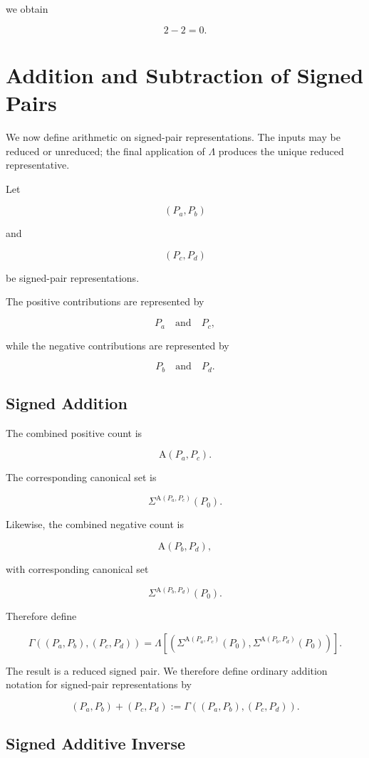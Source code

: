 \documentclass[12pt]{article}
\newcommand{\Alpha}{\mathrm{A}}
\begin{document}
we obtain

\[
\boxed{
2-2=0.
}
\]

\section*{Addition and Subtraction of Signed Pairs}

We now define arithmetic on signed-pair representations. The inputs may be reduced or unreduced; the final application of \(\Lambda\) produces the unique reduced representative.

Let

\[
(P_a,P_b)
\]

and

\[
(P_c,P_d)
\]

be signed-pair representations.

The positive contributions are represented by

\[
P_a
\quad\text{and}\quad
P_c,
\]

while the negative contributions are represented by

\[
P_b
\quad\text{and}\quad
P_d.
\]

\subsection*{Signed Addition}

The combined positive count is

\[
\Alpha(P_a,P_c).
\]

The corresponding canonical set is

\[
\Sigma^{\Alpha(P_a,P_c)}(P_0).
\]

Likewise, the combined negative count is

\[
\Alpha(P_b,P_d),
\]

with corresponding canonical set

\[
\Sigma^{\Alpha(P_b,P_d)}(P_0).
\]

Therefore define

\[
\boxed{
\Gamma
\left(
(P_a,P_b),(P_c,P_d)
\right)
=
\Lambda\left[
\left(
\Sigma^{\Alpha(P_a,P_c)}(P_0),
\Sigma^{\Alpha(P_b,P_d)}(P_0)
\right)
\right].
}
\]

The result is a reduced signed pair. We therefore define ordinary addition notation for signed-pair representations by

\[
\boxed{
(P_a,P_b)+(P_c,P_d)
:=
\Gamma\left((P_a,P_b),(P_c,P_d)\right).
}
\]

\subsection*{Signed Additive Inverse}
\end{document}
